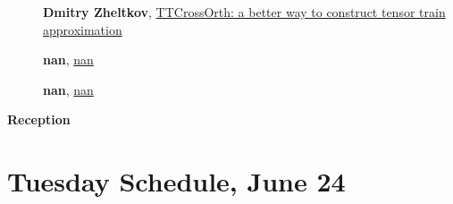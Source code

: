 \documentclass[ILAS2025-program.tex]{subfiles}
\begin{document}
\begin{description}
\begin{description}
        \item[] \hypertarget{up0117}{}\textbf{Dmitry Zheltkov}, \hyperlink{down0117}{TTCrossOrth: a better way to construct tensor train approximation}
        \item[] \hypertarget{up0118}{}\textbf{nan}, \hyperlink{down0118}{nan}
        \item[] \hypertarget{up0119}{}\textbf{nan}, \hyperlink{down0119}{nan}
        \end{description}
    \item[\info{18:00\textrm{--}20:00}] \textbf{Reception} 
    \end{description}
    \newpage

\section{Tuesday Schedule, June 24}
    
\end{document}

